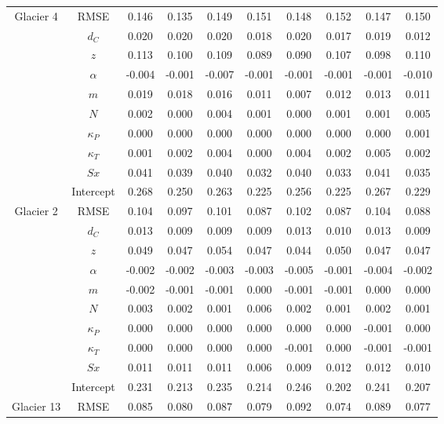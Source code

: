 \documentclass[12pt]{article}
\begin{document}
\begin{landscape}
\begin{table}
\begin{tabular}{cccccccccc}
\multirow{-10}{*}{\cellcolor[HTML]{EFEFEF}Glacier 4} & RMSE & 0.146 & 0.135 & 0.149 & 0.151 & 0.148 & 0.152 & 0.147 & 0.150 \\
 & $d_C$ & 0.020 & 0.020 & 0.020 & 0.018 & 0.020 & 0.017 & 0.019 & 0.012 \\
 & $z$ & 0.113 & 0.100 & 0.109 & 0.089 & 0.090 & 0.107 & 0.098 & 0.110 \\
 & $\alpha$ & -0.004 & -0.001 & -0.007 & -0.001 & -0.001 & -0.001 & -0.001 & -0.010 \\
 & $m$ & 0.019 & 0.018 & 0.016 & 0.011 & 0.007 & 0.012 & 0.013 & 0.011 \\
 & $N$ & 0.002 & 0.000 & 0.004 & 0.001 & 0.000 & 0.001 & 0.001 & 0.005 \\
 & $\kappa_P$ & 0.000 & 0.000 & 0.000 & 0.000 & 0.000 & 0.000 & 0.000 & 0.001 \\
 & $\kappa_T$ & 0.001 & 0.002 & 0.004 & 0.000 & 0.004 & 0.002 & 0.005 & 0.002 \\
 & $Sx$ & 0.041 & 0.039 & 0.040 & 0.032 & 0.040 & 0.033 & 0.041 & 0.035 \\
 & Intercept & 0.268 & 0.250 & 0.263 & 0.225 & 0.256 & 0.225 & 0.267 & 0.229 \\
\multirow{-10}{*}{Glacier 2} & RMSE & 0.104 & 0.097 & 0.101 & 0.087 & 0.102 & 0.087 & 0.104 & 0.088 \\
 
 & $d_C$ & 0.013 & 0.009 & 0.009 & 0.009 & 0.013 & 0.010 & 0.013 & 0.009 \\
 
 & $z$ & 0.049 & 0.047 & 0.054 & 0.047 & 0.044 & 0.050 & 0.047 & 0.047 \\
 
 & $\alpha$ & -0.002 & -0.002 & -0.003 & -0.003 & -0.005 & -0.001 & -0.004 & -0.002 \\
 
 & $m$ & -0.002 & -0.001 & -0.001 & 0.000 & -0.001 & -0.001 & 0.000 & 0.000 \\
 
 & $N$ & 0.003 & 0.002 & 0.001 & 0.006 & 0.002 & 0.001 & 0.002 & 0.001 \\
 
 & $\kappa_P$ & 0.000 & 0.000 & 0.000 & 0.000 & 0.000 & 0.000 & -0.001 & 0.000 \\
 
 & $\kappa_T$ & 0.000 & 0.000 & 0.000 & 0.000 & -0.001 & 0.000 & -0.001 & -0.001 \\
 
 & $Sx$ & 0.011 & 0.011 & 0.011 & 0.006 & 0.009 & 0.012 & 0.012 & 0.010 \\
 
 & Intercept & 0.231 & 0.213 & 0.235 & 0.214 & 0.246 & 0.202 & 0.241 & 0.207 \\
 
\multirow{-10}{*}{\cellcolor[HTML]{EFEFEF}Glacier 13} & RMSE & 0.085 & 0.080 & 0.087 & 0.079 & 0.092 & 0.074 & 0.089 & 0.077
\end{tabular}
\end{table}	
\end{landscape}
\end{document}
